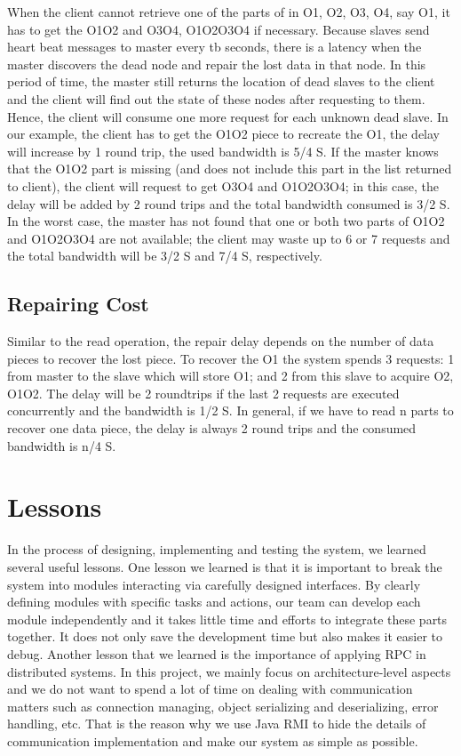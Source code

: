 \documentclass[conference]{IEEEtran}
\begin{document}
When the client cannot retrieve one of the parts of in {O1, O2, O3, O4}, say O1, it has to get the O1O2 and O3O4, O1O2O3O4 if necessary. Because slaves send heart beat messages to master every tb seconds, there is a latency when the master discovers the dead node and repair the lost data in that node. In this period of time, the master still returns the location of dead slaves to the client and the client will find out the state of these nodes after requesting to them. Hence, the client will consume one more request for each unknown dead slave. In our example, the client has to get the O1O2 piece to recreate the O1, the delay will increase by 1 round trip, the used bandwidth is 5/4 S. If the master knows that the O1O2 part is missing (and does not include this part in the list returned to client), the client will request to get O3O4 and O1O2O3O4; in this case, the delay will be added by 2 round trips and the total bandwidth consumed is  3/2 S. In the worst case, the master has not found that one or both two parts of O1O2 and O1O2O3O4 are not available; the client may waste up to 6 or 7 requests and the total bandwidth will be 3/2 S and 7/4 S, respectively.


\subsection{Repairing Cost}
Similar to the read operation, the repair delay depends on the number of data pieces to recover the lost piece. To recover the O1 the system spends 3 requests: 1 from master to the slave which will store O1; and 2 from this slave to acquire O2, O1O2. The delay will be 2 roundtrips if the last 2 requests are executed concurrently and the bandwidth is 1/2 S. In general, if we have to read n parts to recover one data piece, the delay is always 2 round trips and the consumed bandwidth is  n/4 S.

\section{Lessons}
In the process of designing, implementing and testing the system, we learned several useful lessons.
One lesson we learned is that it is important to break the system into modules interacting via carefully designed interfaces. By clearly defining modules with specific tasks and actions, our team can develop each module independently and it takes little time and efforts to integrate these parts together. It does not only save the development time but also makes it easier to debug.
Another lesson that we learned is the importance of applying RPC in distributed systems. In this project, we mainly focus on architecture-level aspects and we do not want to spend a lot of time on dealing with communication matters such as connection managing, object serializing and deserializing, error handling, etc. That is the reason why we use Java RMI to hide the details of communication implementation and make our system as simple as possible.
\end{document}
